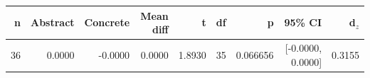 \begin{tabular}{rrrrrrrrr}
\toprule
n & Abstract & Concrete & Mean diff & t & df & p & 95\% CI & d$_z$\\
\midrule
36 & 0.0000 & -0.0000 & 0.0000 & 1.8930 & 35 & 0.066656 & [-0.0000, 0.0000] & 0.3155\\
\bottomrule
\end{tabular}

